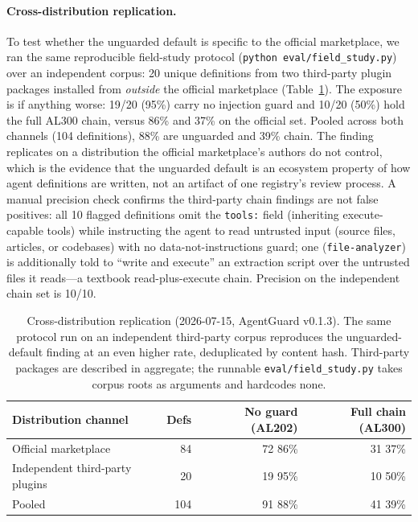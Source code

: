 \documentclass[11pt]{article}
\begin{document}
\paragraph{Cross-distribution replication.}
To test whether the unguarded default is specific to the official marketplace, we ran the same
reproducible field-study protocol (\texttt{python eval/field\_study.py}) over an independent corpus:
20 unique definitions from two third-party plugin packages installed from \emph{outside} the
official marketplace (Table~\ref{tab:field-cross}). The exposure is if anything worse:
19/20 (95\%) carry no injection guard and 10/20 (50\%) hold the full AL300 chain, versus 86\% and
37\% on the official set. Pooled across both channels (104 definitions), 88\% are unguarded and 39\%
chain. The finding replicates on a distribution the official marketplace's authors do not control,
which is the evidence that the unguarded default is an ecosystem property of how agent definitions
are written, not an artifact of one registry's review process. A manual precision check confirms the
third-party chain findings are not false positives: all 10 flagged definitions omit the
\texttt{tools:} field (inheriting execute-capable tools) while instructing the agent to read
untrusted input (source files, articles, or codebases) with no data-not-instructions guard; one
(\texttt{file-analyzer}) is additionally told to ``write and execute'' an extraction script over the
untrusted files it reads---a textbook read-plus-execute chain. Precision on the independent chain set
is 10/10.

\begin{table}[h]
\centering
\begin{tabular}{lrrr}
\toprule
Distribution channel & Defs & No guard (AL202) & Full chain (AL300) \\
\midrule
Official marketplace & 84 & 72 \hfill 86\% & 31 \hfill 37\% \\
Independent third-party plugins & 20 & 19 \hfill 95\% & 10 \hfill 50\% \\
\midrule
Pooled & 104 & 91 \hfill 88\% & 41 \hfill 39\% \\
\bottomrule
\end{tabular}
\caption{Cross-distribution replication (2026-07-15, AgentGuard v0.1.3). The same protocol run on an
independent third-party corpus reproduces the unguarded-default finding at an even higher rate,
deduplicated by content hash. Third-party packages are described in aggregate; the runnable
\texttt{eval/field\_study.py} takes corpus roots as arguments and hardcodes none.}
\label{tab:field-cross}
\end{table}
\end{document}
